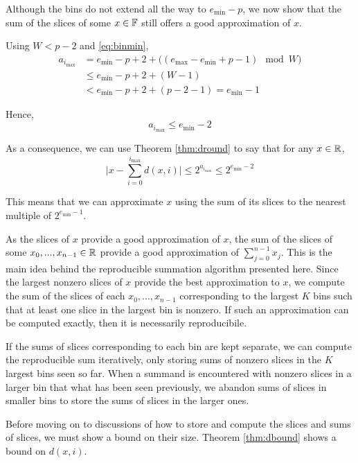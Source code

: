     Although the bins do not extend all the way to $e_{\min} - p$, we now
    show that the sum of the slices of some $x \in \mathbb{F}$ still offers a good
    approximation of $x$.

    Using $W < p - 2$ and \eqref{eq:binmin},
    \begin{align*}
      a_{i_{\max}} & = e_{\min} - p + 2 + \bigl((e_{\max} - e_{\min} + p - 1 ) \mod W \bigr) \\
          & \leq e_{\min} - p + 2 + (W - 1) \\
          & < e_{\min} - p + 2 + (p - 2 - 1) =  e_{\min} - 1 
    \end{align*}

    Hence,
    \[
      a_{i_{\max}} \leq e_{\min} - 2
    \]

    As a consequence, we can use Theorem \ref{thm:dround} to say that for any $x \in \mathbb{R}$,
    \begin{equation}
      \bigl|x - \sum\limits_{i = 0}^{i_{\max}} d(x, i)\bigr| \leq 2^{a_{i_{\max}}} \leq 2^{e_{\min} - 2}
      \label{eq:droundunderflow}
    \end{equation}

    This means that we can approximate $x$ using the sum of its slices to the
    nearest multiple of $2^{e_{\min}-1}$.

    As the slices of $x$ provide a good approximation of $x$, the sum of the slices of some $x_0, ..., x_{n - 1} \in \mathbb{R}$ provide a good approximation of $\sum\limits_{j = 0}^{n - 1} x_j$. This is the main idea behind the reproducible summation algorithm presented here.
    Since the largest nonzero slices of $x$ provide the best approximation to $x$, we compute the sum of the slices of each $x_0, ..., x_{n - 1}$ corresponding to the largest $K$ bins such that at least one slice in the largest bin is nonzero. If such an approximation can be computed exactly, then it is necessarily reproducibile.

    If the sums of slices corresponding to each bin are kept separate, we can compute the reproducible sum iteratively, only storing sums of nonzero slices in the $K$ largest bins seen so far. When a summand is encountered with nonzero slices in a larger bin that what has been seen previously, we abandon sums of slices in smaller bins to store the sums of slices in the larger ones.

    Before moving on to discussions of how to store and compute the slices and sums of slices, we must show a bound on their size. Theorem \ref{thm:dbound} shows a bound on $d(x, i)$.

